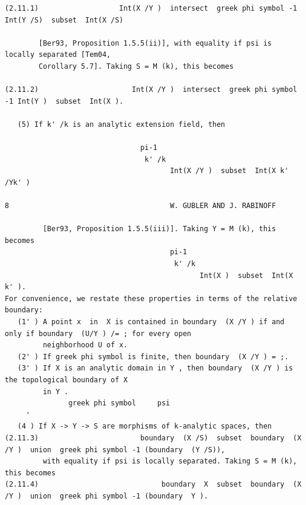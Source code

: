 \documentclass[
  11pt,
]{article}
\begin{document}
\begin{lstlisting}
(2.11.1)                   Int(X /Y )  intersect  greek phi symbol -1 Int(Y /S)  subset  Int(X /S)

        [Ber93, Proposition 1.5.5(ii)], with equality if psi is locally separated [Tem04,
        Corollary 5.7]. Taking S = M (k), this becomes

(2.11.2)                      Int(X /Y )  intersect  greek phi symbol -1 Int(Y )  subset  Int(X ).

   (5) If k' /k is an analytic extension field, then

                                pi-1
                                 k' /k
                                       Int(X /Y )  subset  Int(X k' /Yk' )

8                                      W. GUBLER AND J. RABINOFF

         [Ber93, Proposition 1.5.5(iii)]. Taking Y = M (k), this becomes
                                       pi-1
                                        k' /k
                                              Int(X )  subset  Int(X k' ).
For convenience, we restate these properties in terms of the relative boundary:
   (1' ) A point x  in  X is contained in boundary  (X /Y ) if and only if boundary  (U/Y ) /= ; for every open
         neighborhood U of x.
   (2' ) If greek phi symbol is finite, then boundary  (X /Y ) = ;.
   (3' ) If X is an analytic domain in Y , then boundary  (X /Y ) is the topological boundary of X
         in Y .
               greek phi symbol     psi
     '
   (4 ) If X -> Y -> S are morphisms of k-analytic spaces, then
(2.11.3)                        boundary  (X /S)  subset  boundary  (X /Y )  union  greek phi symbol -1 (boundary  (Y /S)),
         with equality if psi is locally separated. Taking S = M (k), this becomes
(2.11.4)                             boundary  X  subset  boundary  (X /Y )  union  greek phi symbol -1 (boundary  Y ).
\end{lstlisting}
\end{document}
